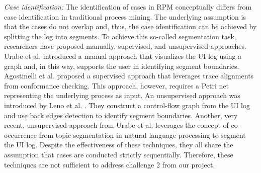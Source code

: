 \noindent \textit{Case identification:} The identification of cases in RPM conceptually differs from case identification in traditional process mining. The underlying assumption is that the cases do not overlap and, thus, the case identification can be achieved by splitting the log into segments. To achieve this so-called segmentation task, researchers have proposed manually, supervised, and unsupervised approaches. Urabe et al. \cite{urabe2019visualizing} introduced a manual approach that visualizes the UI log using a graph and, in this way, supports the user in identifying segment boundaries. Agostinelli et al. \cite{agostinelli202111} proposed a supervised approach that leverages trace alignments from conformance checking. This approach, however, requires a Petri net representing the underlying process as input. An unsupervised approach was introduced by Leno et al. \cite{leno2020identifying}. They construct a control-flow graph from the UI log and use back edges detection to identify segment boundaries. Another, very recent, unsupervised approach from Urabe et al. \cite{Urabe21} leverages the concept of co-occurrence from topic segmentation in natural language processing to segment the UI log. Despite the effectiveness of these techniques, they all share the assumption that cases are conducted strictly sequentially. Therefore, these techniques are not sufficient to address challenge 2 from our project.   

